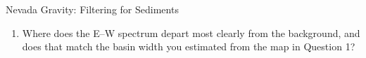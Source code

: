 \begin{activity}{Nevada Gravity: Filtering for Sediments}
\begin{questions}
\begin{enumerate}[label=\roman*]
            \item Where does the E--W spectrum depart most clearly from the background, and does that match the basin width you estimated from the map in Question 1?
            \answerbox[2cm]
        \end{enumerate}






\end{questions}
\end{activity}
